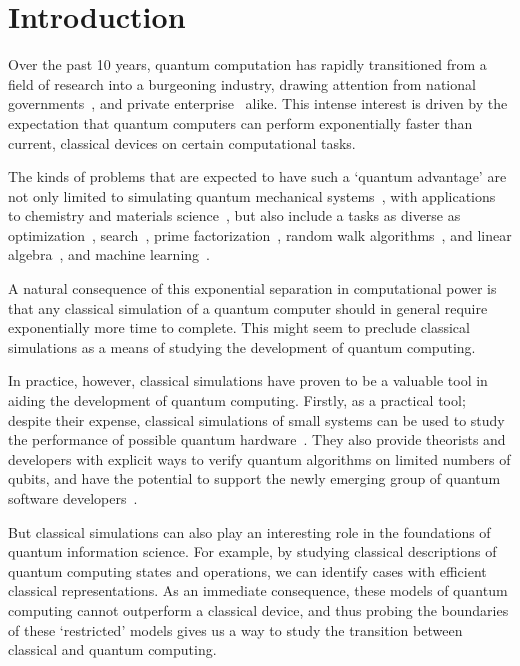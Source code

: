 
\chapter{Introduction}\label{chap:introduction}
Over the past 10 years, quantum computation has rapidly transitioned from a field of research into a burgeoning industry, drawing attention from national governments~\cite{UKNQTP,QuantumFlagship}, and private enterprise~\cite{IBMQ,GoogleQuantum,MicrosoftQuantum} alike. This intense interest is driven by the expectation that quantum computers can perform exponentially faster than current, classical devices on certain computational tasks.\par
The kinds of problems that are expected to have such a `quantum advantage' are not only limited to simulating quantum mechanical systems~\cite{Lloyd1996}, with applications to chemistry and materials science~\cite{Brown2010}, but also include a tasks as diverse as optimization~\cite{Moll2018}, search~\cite{Grover1996}, prime factorization~\cite{Shor1994}, random walk algorithms~\cite{Kendon2006}, and linear algebra~\cite{Harrow2009}, and machine learning~\cite{Biamonte2017}.\par
A natural consequence of this exponential separation in computational power is that any classical simulation of a quantum computer should in general require exponentially more time to complete. This might seem to preclude classical simulations as a means of studying the development of quantum computing.\par
In practice, however, classical simulations have proven to be a valuable tool in aiding the development of quantum computing. Firstly, as a practical tool; despite their expense, classical simulations of small systems can be used to study the performance of possible quantum hardware~\cite{Cai2019}. They also provide theorists and developers with explicit ways to verify quantum algorithms on limited numbers of qubits, and have the potential to support the newly emerging group of quantum software developers~\cite{Qiskit,MicrosoftQDK,CircAnnouncement}.\par
But classical simulations can also play an interesting role in the foundations of quantum information science. For example, by studying classical descriptions of quantum computing states and operations, we can identify cases with efficient classical representations. As an immediate consequence, these models of quantum computing cannot outperform a classical device, and thus probing the boundaries of these `restricted' models gives us a way to study the transition between classical and quantum computing.\par

